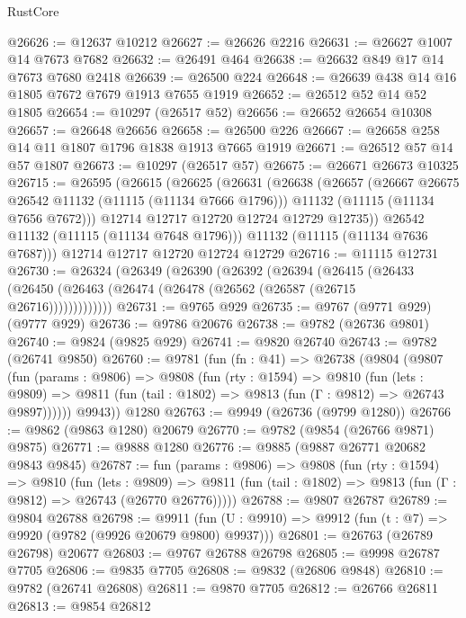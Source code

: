 \begin{lexlean}{RustCore}
\begin{coremodule}
@26626 := @12637 @10212
@26627 := @26626 @2216
@26631 := @26627 @1007 @14 @7673 @7682
@26632 := @26491 @464
@26638 := @26632 @849 @17 @14 @7673 @7680 @2418
@26639 := @26500 @224
@26648 := @26639 @438 @14 @16 @1805 @7672 @7679 @1913 @7655 @1919
@26652 := @26512 @52 @14 @52 @1805
@26654 := @10297 (@26517 @52)
@26656 := @26652 @26654 @10308
@26657 := @26648 @26656
@26658 := @26500 @226
@26667 := @26658 @258 @14 @11 @1807 @1796 @1838 @1913 @7665 @1919
@26671 := @26512 @57 @14 @57 @1807
@26673 := @10297 (@26517 @57)
@26675 := @26671 @26673 @10325
@26715 := @26595
    (@26615
      (@26625
        (@26631
          (@26638
            (@26657
              (@26667 @26675 @26542 @11132 (@11115 (@11134 @7666 @1796)))
              @11132
              (@11115 (@11134 @7656 @7672)))
            @12714
            @12717
            @12720
            @12724
            @12729
            @12735))
        @26542
        @11132
        (@11115 (@11134 @7648 @1796)))
      @11132
      (@11115 (@11134 @7636 @7687)))
    @12714
    @12717
    @12720
    @12724
    @12729
@26716 := @11115 @12731
@26730 := @26324
    (@26349
      (@26390
        (@26392
          (@26394
            (@26415
              (@26433 (@26450 (@26463 (@26474 (@26478 (@26562 (@26587 (@26715 @26716)))))))))))))
@26731 := @9765 @929
@26735 := @9767 (@9771 @929) (@9777 @929)
@26736 := @9786 @20676
@26738 := @9782 (@26736 @9801)
@26740 := @9824 (@9825 @929)
@26741 := @9820 @26740
@26743 := @9782 (@26741 @9850)
@26760 := @9781
    (fun (fn : @41) =>
    @26738
      (@9804
        (@9807
          (fun (params : @9806) =>
          @9808
            (fun (rty : @1594) =>
            @9810
              (fun (lets : @9809) =>
              @9811 (fun (tail : @1802) => @9813 (fun (Γ : @9812) => @26743 @9897))))))
        @9943))
    @1280
@26763 := @9949 (@26736 (@9799 @1280))
@26766 := @9862 (@9863 @1280) @20679
@26770 := @9782 (@9854 (@26766 @9871) @9875)
@26771 := @9888 @1280
@26776 := @9885 (@9887 @26771 @20682 @9843 @9845)
@26787 := fun (params : @9806) =>
  @9808
    (fun (rty : @1594) =>
    @9810
      (fun (lets : @9809) =>
      @9811 (fun (tail : @1802) => @9813 (fun (Γ : @9812) => @26743 (@26770 @26776)))))
@26788 := @9807 @26787
@26789 := @9804 @26788
@26798 := @9911
    (fun (U : @9910) => @9912 (fun (t : @7) => @9920 (@9782 (@9926 @20679 @9800) @9937)))
@26801 := @26763 (@26789 @26798) @20677
@26803 := @9767 @26788 @26798
@26805 := @9998 @26787 @7705
@26806 := @9835 @7705
@26808 := @9832 (@26806 @9848)
@26810 := @9782 (@26741 @26808)
@26811 := @9870 @7705
@26812 := @26766 @26811
@26813 := @9854 @26812

\end{coremodule}
\end{lexlean}
